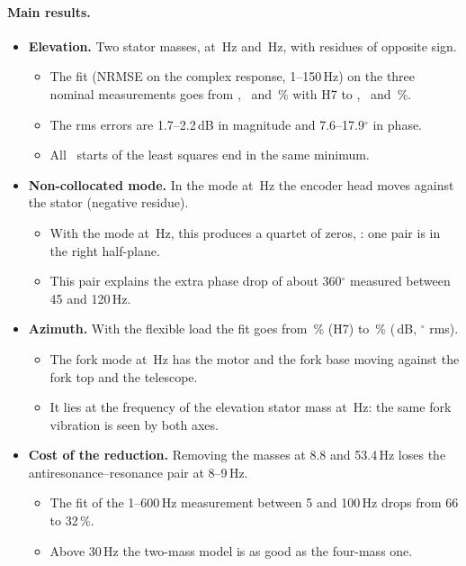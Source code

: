 \documentclass[10pt,a4paper]{article}
\numberwithin{equation}{section}
\begin{document}
\paragraph{Main results.}
\begin{itemize}
\item \textbf{Elevation.} Two stator masses, at \fMassI\,Hz and \fMassII\,Hz, with residues of opposite sign.
  \begin{itemize}
  \item The fit (NRMSE on the complex response, 1--150\,Hz) on the three nominal measurements goes from \fitHPI, \fitHPII\ and \fitHPIII\,\% with H7 to \fitPI, \fitPII\ and \fitPIII\,\%.
  \item The rms errors are 1.7--2.2\,dB in magnitude and 7.6--17.9$^\circ$ in phase.
  \item All \nStartsP\ starts of the least squares end in the same minimum.
  \end{itemize}
\item \textbf{Non-collocated mode.} In the mode at \fMassI\,Hz the encoder head moves against the stator (negative residue).
  \begin{itemize}
  \item With the mode at \fMassII\,Hz, this produces a quartet of zeros, \zerosP: one pair is in the right half-plane.
  \item This pair explains the extra phase drop of about 360$^\circ$ measured between 45 and 120\,Hz.
  \end{itemize}
\item \textbf{Azimuth.} With the flexible load the fit goes from \fitHA\,\% (H7) to \fitA\,\% (\dbA\,dB, \degA$^\circ$ rms).
  \begin{itemize}
  \item The fork mode at \fForkAz\,Hz has the motor and the fork base moving against the fork top and the telescope.
  \item It lies at the frequency of the elevation stator mass at \fMassI\,Hz: the same fork vibration is seen by both axes.
  \end{itemize}
\item \textbf{Cost of the reduction.} Removing the masses at 8.8 and 53.4\,Hz loses the antiresonance--resonance pair at 8--9\,Hz.
  \begin{itemize}
  \item The fit of the 1--600\,Hz measurement between 5 and 100\,Hz drops from 66 to 32\,\%.
  \item Above 30\,Hz the two-mass model is as good as the four-mass one.
  \end{itemize}
\end{itemize}
\end{document}

